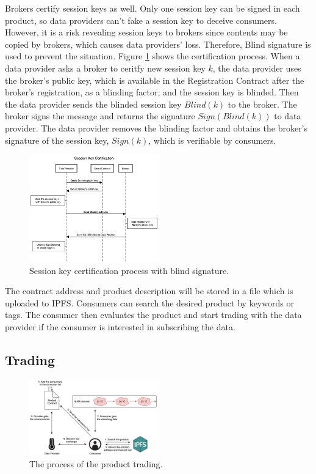 \documentclass[journal,a4paper]{IEEEtran}
\begin{document}
Brokers certify session keys as well. Only one session key can be signed in each product, so data providers can't fake a session key to deceive consumers. However, it is a risk revealing session keys to brokers since contents may be copied by brokers, which causes data providers' loss. Therefore, Blind signature is used to prevent the situation. Figure \ref{fig:key_certification} shows the certification process. When a data provider asks a broker to ceritfy new session key $k$, the data provider uses the broker's public key, which is available in the Registration Contract after the broker's registration, as a blinding factor, and the session key is blinded. Then the data provider sends the blinded session key $Blind(k)$ to the broker. The broker signs the message and returns the signature $Sign(Blind(k))$ to data provider. The data provider removes the blinding factor and obtains the broker's signature of the session key, $Sign(k)$, which is verifiable by consumers.

\begin{figure}[h]
	\centering
	\includegraphics[width=0.5\textwidth]{key_certification}
	\caption{Session key certification process with blind signature.}
	\label{fig:key_certification}
\end{figure}

The contract address and product description will be stored in a file which is uploaded to IPFS. Consumers can search the desired product by keywords or tags. The consumer then evaluates the product and start trading with the data provider if the consumer is interested in subscribing the data.

\subsection{Trading}

\begin{figure}[h]
	\centering
	\includegraphics[width=0.5\textwidth]{trading_product}
	\caption{The process of the product trading.}
	\label{fig:trading_product}
\end{figure}
\end{document}
